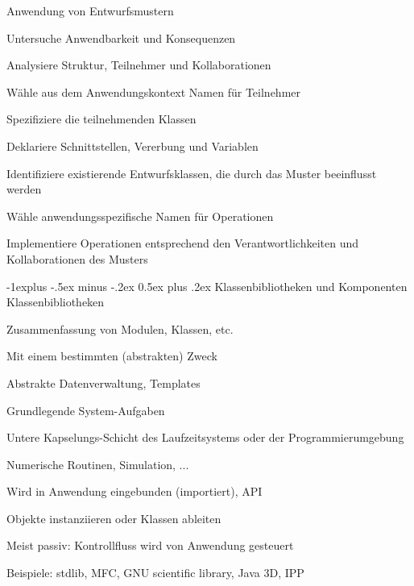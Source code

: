 \documentclass[a4paper]{article}
\makeatletter
\renewcommand{\subsection}{\@startsection{subsection}{2}{0mm}%
                                {-1explus -.5ex minus -.2ex}%
                                {0.5ex plus .2ex}%
                                {\normalfont\normalsize\bfseries}}
\makeatother
\begin{document}
\begin{multicols}{3}
  Anwendung von Entwurfsmustern
  \begin{itemize*}
    \item Untersuche Anwendbarkeit und Konsequenzen
    \item Analysiere Struktur, Teilnehmer und Kollaborationen
    \item Wähle aus dem Anwendungskontext Namen für Teilnehmer
    \item Spezifiziere die teilnehmenden Klassen
    \begin{itemize*}
      \item Deklariere Schnittstellen, Vererbung und Variablen
      \item Identifiziere existierende Entwurfsklassen, die durch das Muster beeinflusst werden
    \end{itemize*}
    \item Wähle anwendungsspezifische Namen für Operationen
    \item Implementiere Operationen entsprechend den Verantwortlichkeiten und Kollaborationen des Musters
  \end{itemize*}

  \subsection{Klassenbibliotheken und Komponenten}
  Klassenbibliotheken
  \begin{itemize*}
    \item Zusammenfassung von Modulen, Klassen, etc.
    \item Mit einem bestimmten (abstrakten) Zweck
    \begin{itemize*}
      \item Abstrakte Datenverwaltung, Templates
      \item Grundlegende System-Aufgaben
      \item Untere Kapselungs-Schicht des Laufzeitsystems oder der Programmierumgebung
      \item Numerische Routinen, Simulation, ...
    \end{itemize*}
    \item Wird in Anwendung eingebunden (importiert), API
    \begin{itemize*}
      \item Objekte instanziieren oder Klassen ableiten
    \end{itemize*}
    \item Meist passiv: Kontrollfluss wird von Anwendung gesteuert
    \item Beispiele: stdlib, MFC, GNU scientific library, Java 3D, IPP
  \end{itemize*}


\end{multicols}
\end{document}

